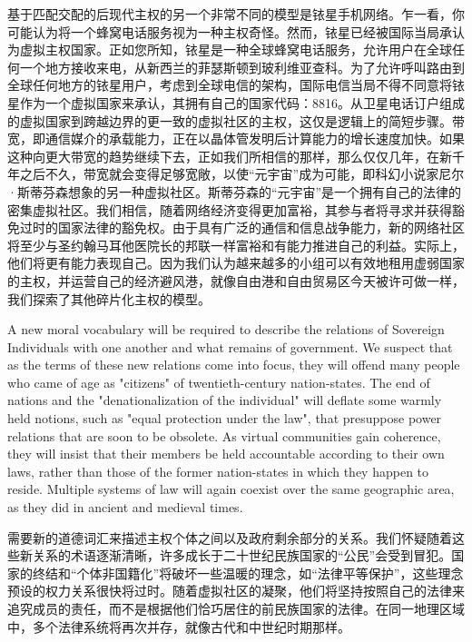 \begin{paracol}{2}[]
	\switchcolumn
	基于匹配交配的后现代主权的另一个非常不同的模型是铱星手机网络。乍一看，你可能认为将一个蜂窝电话服务视为一种主权奇怪。然而，铱星已经被国际当局承认为虚拟主权国家。正如您所知，铱星是一种全球蜂窝电话服务，允许用户在全球任何一个地方接收来电，从新西兰的菲瑟斯顿到玻利维亚查科。为了允许呼叫路由到全球任何地方的铱星用户，考虑到全球电信的架构，国际电信当局不得不同意将铱星作为一个虚拟国家来承认，其拥有自己的国家代码：8816。从卫星电话订户组成的虚拟国家到跨越边界的更一致的虚拟社区的主权，这仅是逻辑上的简短步骤。带宽，即通信媒介的承载能力，正在以晶体管发明后计算能力的增长速度加快。如果这种向更大带宽的趋势继续下去，正如我们所相信的那样，那么仅仅几年，在新千年之后不久，带宽就会变得足够宽敞，以使“元宇宙”成为可能，即科幻小说家尼尔·斯蒂芬森想象的另一种虚拟社区。斯蒂芬森的“元宇宙”是一个拥有自己的法律的密集虚拟社区。我们相信，随着网络经济变得更加富裕，其参与者将寻求并获得豁免过时的国家法律的豁免权。由于具有广泛的通信和信息战争能力，新的网络社区将至少与圣约翰马耳他医院长的邦联一样富裕和有能力推进自己的利益。实际上，他们将更有能力表现自己。因为我们认为越来越多的小组可以有效地租用虚弱国家的主权，并运营自己的经济避风港，就像自由港和自由贸易区今天被许可做一样，我们探索了其他碎片化主权的模型。
	
	\switchcolumn*
	A new moral vocabulary will be required to describe the relations of Sovereign Individuals with one another and what remains of government. We suspect that as the terms of these new relations come into focus, they will offend many people who came of age as "citizens" of twentieth-century nation-states. The end of nations and the "denationalization of the individual" will deflate some warmly held notions, such as "equal protection under the law", that presuppose power relations that are soon to be obsolete. As virtual communities gain coherence, they will insist that their members be held accountable according to their own laws, rather than those of the former nation-states in which they happen to reside. Multiple systems of law will again coexist over the same geographic area, as they did in ancient and medieval times.
	
	\switchcolumn
	需要新的道德词汇来描述主权个体之间以及政府剩余部分的关系。我们怀疑随着这些新关系的术语逐渐清晰，许多成长于二十世纪民族国家的“公民”会受到冒犯。国家的终结和“个体非国籍化”将破坏一些温暖的理念，如“法律平等保护”，这些理念预设的权力关系很快将过时。随着虚拟社区的凝聚，他们将坚持按照自己的法律来追究成员的责任，而不是根据他们恰巧居住的前民族国家的法律。在同一地理区域中，多个法律系统将再次并存，就像古代和中世纪时期那样。
	

\end{paracol}
